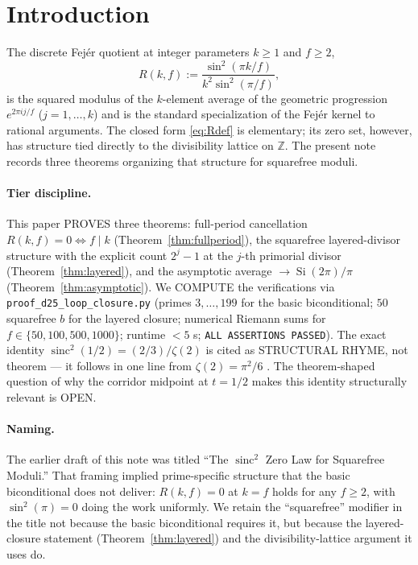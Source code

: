\documentclass[11pt,reqno]{amsart}
\theoremstyle{plain}
\theoremstyle{definition}
\theoremstyle{remark}
\DeclareMathOperator{\sinc}{sinc}
\DeclareMathOperator{\Si}{Si}
\newcommand{\Z}{\mathbb{Z}}
\begin{document}
\section{Introduction}\label{sec:intro}

The discrete Fej\'er quotient at integer parameters $k \ge 1$ and
$f \ge 2$,
\begin{equation}\label{eq:Rdef}
  R(k, f) := \frac{\sin^{2}(\pi k/f)}{k^{2} \sin^{2}(\pi/f)},
\end{equation}
is the squared modulus of the $k$-element average of the geometric
progression $e^{2\pi i j/f}$ ($j = 1, \ldots, k$) and is the standard
specialization of the Fej\'er kernel \cite{Fejer1900,Zygmund2002} to
rational arguments. The closed form \eqref{eq:Rdef} is elementary;
its zero set, however, has structure tied directly to the divisibility
lattice on $\Z$. The present note records three theorems organizing
that structure for squarefree moduli.

\paragraph{Tier discipline.} This paper PROVES three theorems:
full-period cancellation $R(k, f) = 0 \iff f \mid k$
(Theorem~\ref{thm:fullperiod}), the squarefree layered-divisor
structure with the explicit count $2^{j} - 1$ at the $j$-th primorial
divisor (Theorem~\ref{thm:layered}), and the asymptotic average
$\to \Si(2\pi)/\pi$ (Theorem~\ref{thm:asymptotic}). We COMPUTE the
verifications via \texttt{proof\_d25\_loop\_closure.py} (primes
$3, \ldots, 199$ for the basic biconditional; $50$ squarefree $b$ for
the layered closure; numerical Riemann sums for $f \in \{50, 100, 500,
1000\}$; runtime $< 5$ s; \texttt{ALL ASSERTIONS PASSED}). The exact
identity $\sinc^{2}(1/2) = (2/3)/\zeta(2)$ is cited as STRUCTURAL
RHYME, not theorem --- it follows in one line from $\zeta(2) = \pi^2/6$
\cite{Apostol1976,HardyWright2008}. The theorem-shaped question of why
the corridor midpoint at $t = 1/2$ makes this identity structurally
relevant is OPEN.

\paragraph{Naming.} The earlier draft of this note was titled ``The
$\sinc^{2}$ Zero Law for Squarefree Moduli.'' That framing implied
prime-specific structure that the basic biconditional does not deliver:
$R(k, f) = 0$ at $k = f$ holds for any $f \ge 2$, with $\sin^{2}(\pi)
= 0$ doing the work uniformly. We retain the ``squarefree'' modifier
in the title not because the basic biconditional requires it, but
because the layered-closure statement (Theorem~\ref{thm:layered}) and
the divisibility-lattice argument it uses do.
\end{document}
